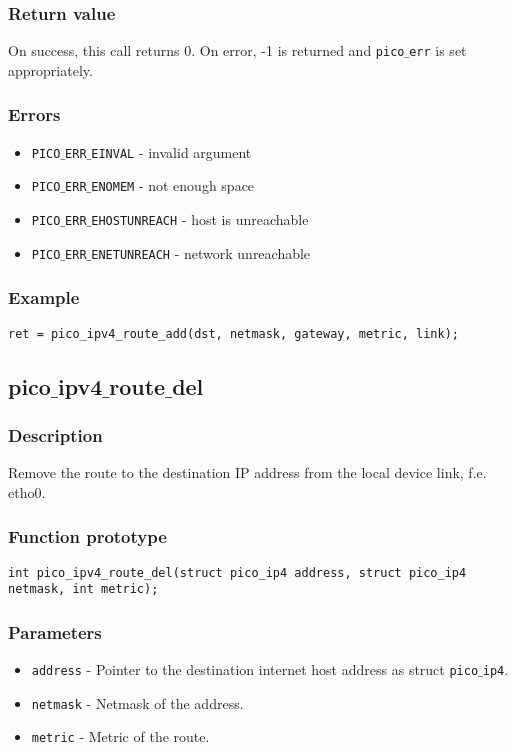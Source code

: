 \subsubsection*{Return value}
On success, this call returns 0. On error, -1 is returned and \texttt{pico$\_$err} is set appropriately. 

\subsubsection*{Errors}
\begin{itemize}[noitemsep]
\item \texttt{PICO$\_$ERR$\_$EINVAL} - invalid argument
\item \texttt{PICO$\_$ERR$\_$ENOMEM} - not enough space
\item \texttt{PICO$\_$ERR$\_$EHOSTUNREACH} - host is unreachable
\item \texttt{PICO$\_$ERR$\_$ENETUNREACH} - network unreachable
\end{itemize}

\subsubsection*{Example}
\begin{verbatim}
ret = pico_ipv4_route_add(dst, netmask, gateway, metric, link);
\end{verbatim}



\subsection{pico$\_$ipv4$\_$route$\_$del}

\subsubsection*{Description}
Remove the route to the destination IP address from the local device link, f.e. etho0.

\subsubsection*{Function prototype}
\begin{verbatim}
int pico_ipv4_route_del(struct pico_ip4 address, struct pico_ip4 netmask, int metric);
\end{verbatim}

\subsubsection*{Parameters}
\begin{itemize}[noitemsep]
\item \texttt{address} - Pointer to the destination internet host address as struct \texttt{pico$\_$ip4}.
\item \texttt{netmask} - Netmask of the address.
\item \texttt{metric} - Metric of the route.
\end{itemize}

